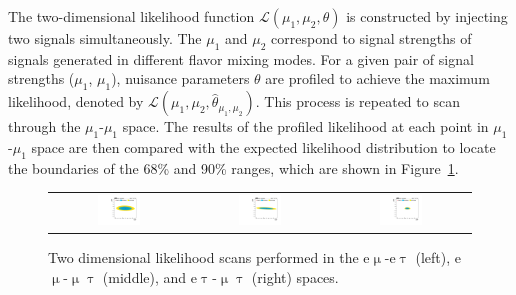The two-dimensional likelihood function $\mathcal{L}(\mu_1, \mu_2, \theta)$ is constructed by injecting two signals simultaneously. The $\mu_1$ and $\mu_2$ correspond to signal strengths of signals generated in different flavor mixing modes. For a given pair of signal strengths ($\mu_1$, $\mu_1$), nuisance parameters $\theta$ are profiled to achieve the maximum likelihood, denoted by $\mathcal{L}(\mu_1, \mu_2, \hat{\theta}_{\mu_1,\mu_2})$. This process is repeated to scan through the $\mu_1$-$\mu_1$ space. The results of the profiled likelihood at each point in $\mu_1$-$\mu_1$ space are then compared with the expected likelihood distribution to locate the boundaries of the 68\% and 90\% ranges, which are shown in Figure~\ref{fig:2DScan}.

 \begin{figure}[tbh!]
 \begin{center}
 \begin{tabular}{ccc}
 \includegraphics[width=0.33\textwidth]{figures/Part4/Sensitivity/2dScan_emuetau}&
 \includegraphics[width=0.33\textwidth]{figures/Part4/Sensitivity/2dScan_emumutau}&
 \includegraphics[width=0.33\textwidth]{figures/Part4/Sensitivity/2dScan_etaumutau}\\
 \end{tabular}
 \caption{Two dimensional likelihood scans performed in the e$\upmu$-e$\uptau$ (left), e$\upmu$-$\upmu\uptau$ (middle), and e$\uptau$-$\upmu\uptau$ (right) spaces.}
 \label{fig:2DScan}
 \end{center}
 \end{figure}